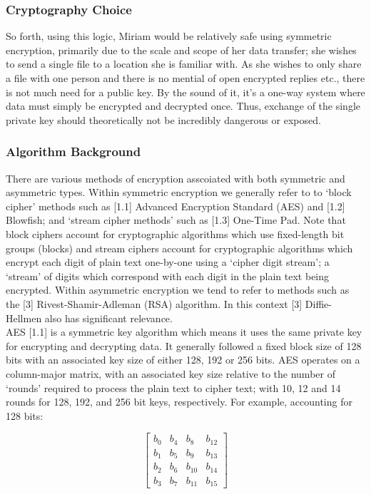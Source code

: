 \documentclass[11pt, english]{article}
\begin{document}
		\subsubsection{Cryptography Choice}

So forth, using this logic, Miriam would be relatively safe using symmetric encryption, primarily due to the scale and scope of her data transfer; she wishes to send a single file to a location she is familiar with. As she wishes to only share a file with one person and there is no mential of open encrypted replies etc., there is not much need for a public key. By the sound of it, it's a one-way system where data must simply be encrypted and decrypted once. Thus, exchange of the single private key should theoretically not be incredibly dangerous or exposed. 

		\subsubsection{Algorithm Background}

	There are various methods of encryption asscoiated with both symmetric and asymmetric types. Within symmetric encryption we generally refer to to `block cipher' methods such as [1.1] Advanced Encryption Standard (AES) and [1.2] Blowfish; and `stream cipher methods' such as [1.3] One-Time Pad. Note that block ciphers account for cryptographic algorithms which use fixed-length bit groups (blocks) and stream ciphers account for cryptographic algorithms which encrypt each digit of plain text one-by-one using a `cipher digit stream'; a `stream' of digits which correspond with each digit in the plain text being encrypted. Within asymmetric encryption we tend to refer to methods such as the [3] Rivest-Shamir-Adleman (RSA) algorithm. In this context [3] Diffie-Hellmen also has significant relevance.\\

	AES [1.1] is a symmetric key algorithm which means it uses the same private key for encrypting and decrypting data. It generally followed a fixed block size of 128 bits with an associated key size of either 128, 192 or 256 bits. AES operates on a column-major matrix, with an associated key size relative to the number of `rounds' required to process the plain text to cipher text; with 10, 12 and 14 rounds for 128, 192, and 256 bit keys, respectively. For example, accounting for 128 bits:

	$$\begin{bmatrix}
	b_0 & b_4 & b_8 & b_{12}\\
	b_1 & b_5 & b_9 & b_{13}\\
	b_2 & b_6 & b_{10} & b_{14}\\
	b_3 & b_7 & b_{11} & b_{15}
	\end{bmatrix}$$
\end{document}
